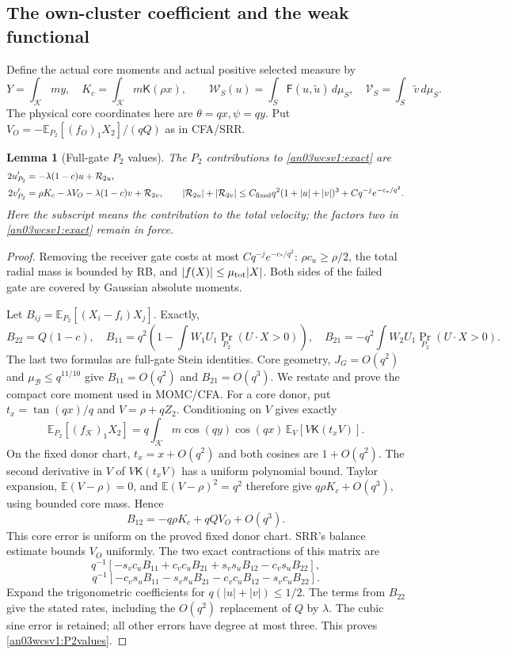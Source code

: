 \documentclass[11pt]{article}
\numberwithin{equation}{section}
\newtheorem{lemma}[theorem]{Lemma}\newtheorem{proposition}[theorem]{Proposition}
\theoremstyle{remark}\newtheorem{remark}[theorem]{Remark}
\newcommand{\E}{\mathbb E}\newcommand{\dd}{\,d}\newcommand{\one}{\mathbf1}
\newcommand{\KK}{\mathcal K}\newcommand{\BB}{\mathcal B}
\newcommand{\Kfun}{\mathsf K}\newcommand{\Ffun}{\mathsf F}
\begin{document}
\subsection{The own-cluster coefficient and the weak functional}
Define the actual core moments and actual positive selected measure by
\[
 Y=\int_\KK my,\quad K_c=\int_\KK m\Kfun(\rho x),\qquad
 \mathcal W_S(u)=\int_S\Ffun(u,\widetilde u)\,d\mu_S,\quad
 \mathcal V_S=\int_S\widetilde v\,d\mu_S.
\]
The physical core coordinates here are $\theta=qx,\psi=qy$.
Put $V_O=-\E_{P_2}[(f_O)_1X_2]/(qQ)$ as in CFA/SRR.

\begin{lemma}[Full-gate $P_2$ values]
\label{an03wcsv1:P2}
The $P_2$ contributions to \eqref{an03wcsv1:exact} are
\begin{align}
 2u'_{P_2}&=-\lambda(1-c)u+\mathcal R_{2u},\notag\\
 2v'_{P_2}&=\rho K_c-\lambda V_O-\lambda(1-c)v+\mathcal R_{2v},
 \qquad
 |\mathcal R_{2u}|+|\mathcal R_{2v}|
 \le C_{\rm fixed}q^2(1+|u|+|v|)^3+Cq^{-j}e^{-c_*/q^2}.
 \label{an03wcsv1:P2values}
\end{align}
Here the subscript means the contribution to the total velocity;
the factors two in \eqref{an03wcsv1:exact} remain in force.
\end{lemma}
\begin{proof}
Removing the receiver gate costs at most $Cq^{-j}e^{-c_*/q^2}$:
$\rho c_u\ge\rho/2$, the total radial mass is bounded by RB,
and $|f(X)|\le\mu_{\rm tot}|X|$. Both sides of the failed gate
are covered by Gaussian absolute moments.

Let $B_{ij}=\E_{P_2}[(X_i-f_i)X_j]$. Exactly,
\[
 B_{22}=Q(1-c),\quad
 B_{11}=q^2\left(1-\int W_1U_1\Pr_{P_2}(U\cdot X>0)\right),
 \quad
 B_{21}=-q^2\int W_2U_1\Pr_{P_2}(U\cdot X>0).
\]
The last two formulas are full-gate Stein identities.
Core geometry, $J_G=O(q^2)$ and $\mu_\BB\le q^{11/10}$
give $B_{11}=O(q^2)$ and $B_{21}=O(q^3)$.
We restate and prove the compact core moment used in MOMC/CFA.
For a core donor, put $t_x=\tan(qx)/q$ and $V=\rho+qZ_2$.
Conditioning on $V$ gives exactly
\[
 \E_{P_2}[(f_\KK)_1X_2]
 =q\int_\KK m\cos(qy)\cos(qx)\,
                          \E_V[V\Kfun(t_xV)].
\]
On the fixed donor chart, $t_x=x+O(q^2)$ and both cosines
are $1+O(q^2)$. The second derivative in $V$ of
$V\Kfun(t_xV)$ has a uniform polynomial bound. Taylor expansion,
$\E(V-\rho)=0$, and $\E(V-\rho)^2=q^2$ therefore give
$q\rho K_c+O(q^3)$, using bounded core mass. Hence
\[
 B_{12}=-q\rho K_c+qQ V_O+O(q^3).
\]
This core error is uniform on the proved fixed donor chart.
SRR's balance estimate bounds $V_O$ uniformly.
The two exact contractions of this matrix are
\[
 q^{-1}[-s_vc_uB_{11}+c_vc_uB_{21}+s_vs_uB_{12}-c_vs_uB_{22}],
\]
\[
 q^{-1}[-c_vs_uB_{11}-s_vs_uB_{21}-c_vc_uB_{12}-s_vc_uB_{22}].
\]
Expand the trigonometric coefficients for $q(|u|+|v|)\le1/2$.
The terms from $B_{22}$ give the stated rates, including the
$O(q^2)$ replacement of $Q$ by $\lambda$.
The cubic sine error is retained; all other errors have degree at
most three. This proves \eqref{an03wcsv1:P2values}.
\end{proof}
\end{document}
